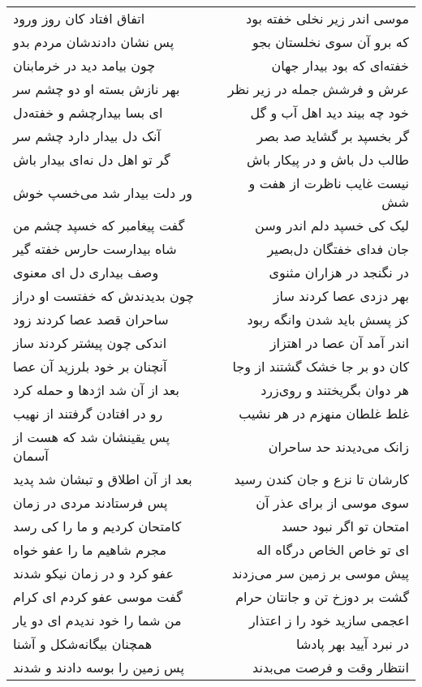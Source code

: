 \begin{center}
\begin{longtable}{l p{0.5cm} r}
اتفاق افتاد کان روز ورود
&&
موسی اندر زیر نخلی خفته بود
\\
پس نشان دادندشان مردم بدو
&&
که برو آن سوی نخلستان بجو
\\
چون بیامد دید در خرمابنان
&&
خفته‌ای که بود بیدار جهان
\\
بهر نازش بسته او دو چشم سر
&&
عرش و فرشش جمله در زیر نظر
\\
ای بسا بیدارچشم و خفته‌دل
&&
خود چه بیند دید اهل آب و گل
\\
آنک دل بیدار دارد چشم سر
&&
گر بخسپد بر گشاید صد بصر
\\
گر تو اهل دل نه‌ای بیدار باش
&&
طالب دل باش و در پیکار باش
\\
ور دلت بیدار شد می‌خسپ خوش
&&
نیست غایب ناظرت از هفت و شش
\\
گفت پیغامبر که خسپد چشم من
&&
لیک کی خسپد دلم اندر وسن
\\
شاه بیدارست حارس خفته گیر
&&
جان فدای خفتگان دل‌بصیر
\\
وصف بیداری دل ای معنوی
&&
در نگنجد در هزاران مثنوی
\\
چون بدیدندش که خفتست او دراز
&&
بهر دزدی عصا کردند ساز
\\
ساحران قصد عصا کردند زود
&&
کز پسش باید شدن وانگه ربود
\\
اندکی چون پیشتر کردند ساز
&&
اندر آمد آن عصا در اهتزاز
\\
آنچنان بر خود بلرزید آن عصا
&&
کان دو بر جا خشک گشتند از وجا
\\
بعد از آن شد اژدها و حمله کرد
&&
هر دوان بگریختند و روی‌زرد
\\
رو در افتادن گرفتند از نهیب
&&
غلط غلطان منهزم در هر نشیب
\\
پس یقینشان شد که هست از آسمان
&&
زانک می‌دیدند حد ساحران
\\
بعد از آن اطلاق و تبشان شد پدید
&&
کارشان تا نزع و جان کندن رسید
\\
پس فرستادند مردی در زمان
&&
سوی موسی از برای عذر آن
\\
کامتحان کردیم و ما را کی رسد
&&
امتحان تو اگر نبود حسد
\\
مجرم شاهیم ما را عفو خواه
&&
ای تو خاص الخاص درگاه اله
\\
عفو کرد و در زمان نیکو شدند
&&
پیش موسی بر زمین سر می‌زدند
\\
گفت موسی عفو کردم ای کرام
&&
گشت بر دوزخ تن و جانتان حرام
\\
من شما را خود ندیدم ای دو یار
&&
اعجمی سازید خود را ز اعتذار
\\
همچنان بیگانه‌شکل و آشنا
&&
در نبرد آیید بهر پادشا
\\
پس زمین را بوسه دادند و شدند
&&
انتظار وقت و فرصت می‌بدند
\\
\end{longtable}
\end{center}
